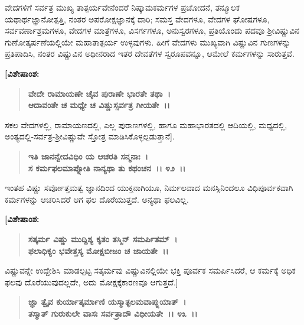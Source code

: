 ವೇದಗಳಿಗೆ ಸರ್ವತ್ರ ಮುಖ್ಯ ತಾತ್ಪರ್ಯವೇನೆಂದರೆ ನಿಷ್ಕಾಮಕರ್ಮಗಳ ಪ್ರಚೋದನೆ, ತನ್ಮೂಲಕ ಯಥಾರ್ಥಜ್ಞಾನೋತ್ಪತ್ತಿ, ನಂತರ ಅಪರೋಕ್ಷಜ್ಞಾನಕ್ಕೆ ದಾರಿ; ಸಮಸ್ತ ವೇದಗಳೂ, ವೇದಗಳ ಘೋಷಗಳೂ, ಸರ್ವವರ್ಣಾಶ್ರಮಗಳೂ, ವೇದಗಳ ಮಾತ್ರೆಗಳೂ, ವಿಸರ್ಗಗಳೂ, ಅನುಸ್ವರಗಳೂ, ಪ್ರತಿಯೊಂದು ಪದವೂ ಶ‍್ರೀವಿಷ್ಣುವಿನ ಗುಣೋತ್ಕರ್ಷಣೆಯಲ್ಲಿಯೇ ಮಹಾತಾತ್ಪರ್ಯ ಉಳ್ಳವುಗಳು. ಹೀಗೆ ವೇದಗಳು ಮುಖ್ಯವಾಗಿ ವಿಷ್ಣುವಿನ ಗುಣಗಳನ್ನು ಪ್ರತಿಪಾದಿಸಿ, ನಂತರ ವಿಷ್ಣುವಿನ ಅಧೀನರಾದ ಇತರ ದೇವತೆಗಳ ಸ್ವರೂಪವನ್ನೂ, ಆಮೇಲೆ ಕರ್ಮಗಳನ್ನು ಸಾರುತ್ತವೆ.

\begin{flushleft}
\textbf{[ವಿಶೇಷಾಂಶ: }
\end{flushleft}

\begin{verse}
\textbf{ವೇದೇ ರಾಮಾಯಣೇ ಚೈವ ಪುರಾಣೇ ಭಾರತೇ ತಥಾ~।}\\\textbf{ಆದಾವಂತೇ ಚ ಮಧ್ಯೇ ಚ ವಿಷ್ಣುಸ್ಸರ್ವತ್ರ ಗೀಯತೇ~।।} 
\end{verse}

ಸಕಲ ವೇದಗಳಲ್ಲಿ, ರಾಮಾಯಣದಲ್ಲಿ, ಎಲ್ಲ ಪುರಾಣಗಳಲ್ಲಿ, ಹಾಗೂ ಮಹಾಭಾರತ\-ದಲ್ಲಿ ಆದಿಯಲ್ಲಿ, ಮಧ್ಯದಲ್ಲಿ, ಅಂತ್ಯದಲ್ಲಿ-ಸರ್ವತ್ರ-ಶ‍್ರೀವಿಷ್ಣುವೇ ಸ್ತೋತ್ರ ಮಾಡಿಸಿ\break ಕೊಳ್ಳಲ್ಪಡುತ್ತಾನೆ].

\begin{verse}
\textbf{ಇತಿ ಜಾನನ್ವೇದವಿಧಿಂ ಯ ಆಚರತಿ ಸನ್ಮನಾಃ~।}\\\textbf{ಸ ಕರ್ಮಫಲಮಾಪ್ನೋತಿ ನಾನ್ಯಥಾ ತು ಕಥಂಚನ~।। ೪೨~।।}
\end{verse}

ಇಂತಹ ವಿಷ್ಣು ಸರ್ವೋತ್ತಮತ್ವ ಜ್ಞಾನದಿಂದ ಯುಕ್ತನಾಗಿಯೂ, ನಿರ್ಮಲವಾದ ಮನಸ್ಸಿನಿಂದಲೂ ವಿಧಿಪೂರ್ವಕವಾಗಿ ಕರ್ಮಗಳನ್ನು ಆಚರಿಸಿದರೆ ಆಗ ಫಲ ದೊರೆಯುತ್ತದೆ. ಅನ್ಯಥಾ ಫಲವಿಲ್ಲ. 

\newpage

\begin{flushleft}
\textbf{[ವಿಶೇಷಾಂಶ:}
\end{flushleft}

\begin{verse}
\textbf{ಸತ್ಕರ್ಮ ವಿಷ್ಣು ಮುದ್ದಿಶ್ಯ ಕೃತಂ ತಸ್ಮಿನ್ ಸಮರ್ಪಿತಮ್~।}\\\textbf{ಫಲಾಧಿಕ್ಯಂ ಭವೇತ್ತಸ್ಯ ಮೋಕ್ಷಬೀಜಂ ಚ ಜಾಯತೇ~।।} 
\end{verse}

ವಿಷ್ಣುವನ್ನೇ ಉದ್ದೇಶಿಸಿ ಮಾಡಲ್ಪಟ್ಟ ಸತ್ಕರ್ಮವು ವಿಷ್ಣುವಿನಲ್ಲಿಯೇ ಭಕ್ತಿ ಪೂರ್ವಕ ಸಮರ್ಪಿಸಿದರೆ, ಆ ಕರ್ಮಕ್ಕೆ ಅಧಿಕ ಫಲವು ದೊರೆಯುವುದಲ್ಲದೇ, ಅದು ಮೋಕ್ಷಕ್ಕೆ\break ಕಾರಣವೂ ಆಗುತ್ತದೆ.]

\begin{verse}
\textbf{ಜ್ಞಾ ತ್ವೈವ ಕುರ್ಯಾತ್ಕರ್ಮಾಣಿ ಯಸ್ಮಾತ್ಫಲಮವಾಪ್ನುಯಾತ್~।}\\\textbf{ತಸ್ಮಾತ್ ಗುರುಕುಲೇ ವಾಸಃ ಸರ್ವತ್ರಾದೌ ವಿಧೀಯತೇ~।। ೪೩~।।}
\end{verse}

